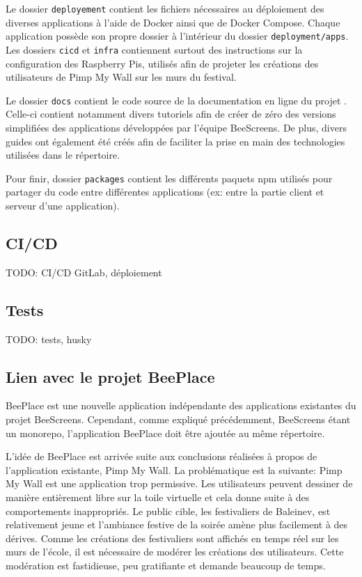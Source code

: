 Le dossier \texttt{deployement} contient les fichiers nécessaires au déploiement des diverses applications à l'aide de Docker ainsi que de Docker Compose. Chaque application possède son propre dossier à l'intérieur du dossier \texttt{deployment/apps}. Les dossiers \texttt{cicd} et \texttt{infra} contiennent surtout des instructions sur la configuration des Raspberry Pis, utilisés afin de projeter les créations des utilisateurs de Pimp My Wall sur les murs du festival.

Le dossier \texttt{docs} contient le code source de la documentation en ligne du projet \cite{beescreensdocs}. Celle-ci contient notamment divers tutoriels afin de créer de zéro des versions simplifiées des applications développées par l'équipe BeeScreens. De plus, divers guides ont également été créés afin de faciliter la prise en main des technologies utilisées dans le répertoire.

Pour finir, dossier \texttt{packages} contient les différents paquets \Gls{npm} utilisés pour partager du code entre différentes applications (ex: entre la partie client et serveur d'une application).

\subsection{CI/CD}

TODO: CI/CD GitLab, déploiement

\subsection{Tests}

TODO: tests, husky

\subsection{Lien avec le projet BeePlace}
\label{sec:lien-avec-le-projet-beeplace}

BeePlace est une nouvelle application indépendante des applications existantes du projet BeeScreens. Cependant, comme expliqué précédemment, BeeScreens étant un monorepo, l'application BeePlace doit être ajoutée au même répertoire.

L'idée de BeePlace est arrivée suite aux conclusions réalisées à propos de l'application existante, Pimp My Wall. La problématique est la suivante: Pimp My Wall est une application trop permissive. Les utilisateurs peuvent dessiner de manière entièrement libre sur la toile virtuelle et cela donne suite à des comportements inappropriés. Le public cible, les festivaliers de Baleinev, est relativement jeune et l'ambiance festive de la soirée amène plus facilement à des dérives. Comme les créations des festivaliers sont affichés en temps réel sur les murs de l'école, il est nécessaire de modérer les créations des utilisateurs. Cette modération est fastidieuse, peu gratifiante et demande beaucoup de temps.

